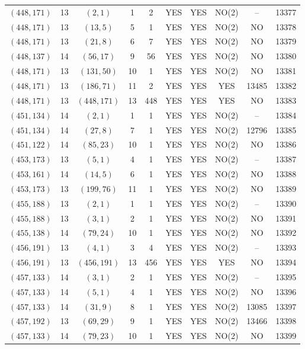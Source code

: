 \begin{longtable}{|c|c|c|c|c|c|c|c|c|c|}
$(448, 171)$ & 13 & $(2, 1)$ & 1 & 2 & YES & YES & NO(2) & -- & 13377\\
$(448, 171)$ & 13 & $(13, 5)$ & 5 & 1 & YES & YES & NO(2) & NO & 13378\\
$(448, 171)$ & 13 & $(21, 8)$ & 6 & 7 & YES & YES & NO(2) & NO & 13379\\
$(448, 137)$ & 14 & $(56, 17)$ & 9 & 56 & YES & YES & NO(2) & NO & 13380\\
$(448, 171)$ & 13 & $(131, 50)$ & 10 & 1 & YES & YES & NO(2) & NO & 13381\\
$(448, 171)$ & 13 & $(186, 71)$ & 11 & 2 & YES & YES & YES & 13485 & 13382\\
$(448, 171)$ & 13 & $(448, 171)$ & 13 & 448 & YES & YES & YES & NO & 13383\\
$(451, 134)$ & 14 & $(2, 1)$ & 1 & 1 & YES & YES & NO(2) & -- & 13384\\
$(451, 134)$ & 14 & $(27, 8)$ & 7 & 1 & YES & YES & NO(2) & 12796 & 13385\\
$(451, 122)$ & 14 & $(85, 23)$ & 10 & 1 & YES & YES & NO(2) & NO & 13386\\
$(453, 173)$ & 13 & $(5, 1)$ & 4 & 1 & YES & YES & NO(2) & -- & 13387\\
$(453, 161)$ & 14 & $(14, 5)$ & 6 & 1 & YES & YES & NO(2) & NO & 13388\\
$(453, 173)$ & 13 & $(199, 76)$ & 11 & 1 & YES & YES & NO(2) & NO & 13389\\
$(455, 188)$ & 13 & $(2, 1)$ & 1 & 1 & YES & YES & NO(2) & -- & 13390\\
$(455, 188)$ & 13 & $(3, 1)$ & 2 & 1 & YES & YES & NO(2) & NO & 13391\\
$(455, 138)$ & 14 & $(79, 24)$ & 10 & 1 & YES & YES & NO(2) & NO & 13392\\
$(456, 191)$ & 13 & $(4, 1)$ & 3 & 4 & YES & YES & NO(2) & -- & 13393\\
$(456, 191)$ & 13 & $(456, 191)$ & 13 & 456 & YES & YES & YES & NO & 13394\\
$(457, 133)$ & 14 & $(3, 1)$ & 2 & 1 & YES & YES & NO(2) & -- & 13395\\
$(457, 133)$ & 14 & $(5, 1)$ & 4 & 1 & YES & YES & NO(2) & NO & 13396\\
$(457, 133)$ & 14 & $(31, 9)$ & 8 & 1 & YES & YES & NO(2) & 13085 & 13397\\
$(457, 192)$ & 13 & $(69, 29)$ & 9 & 1 & YES & YES & NO(2) & 13466 & 13398\\
$(457, 133)$ & 14 & $(79, 23)$ & 10 & 1 & YES & YES & NO(2) & NO & 13399\\

\end{longtable}
